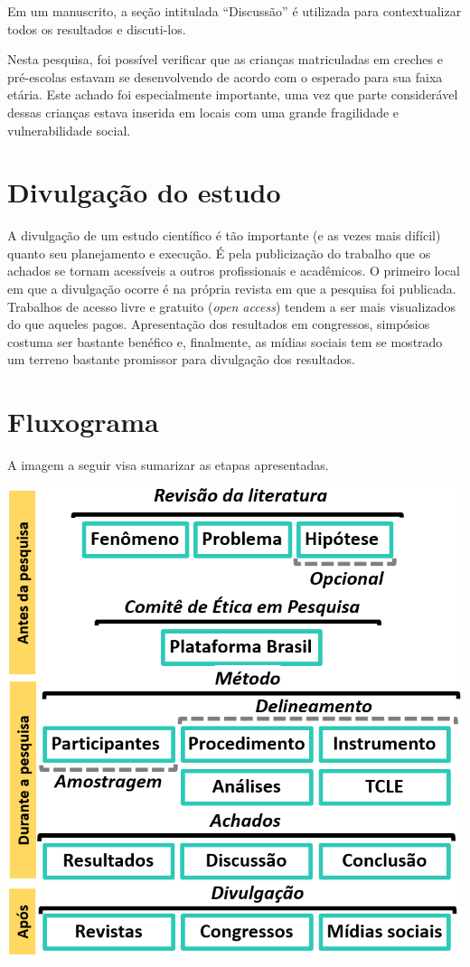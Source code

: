 \documentclass[
]{book}
\begin{document}
Em um manuscrito, a seção intitulada ``Discussão'' é utilizada para contextualizar todos os resultados e discuti-los.

Nesta pesquisa, foi possível verificar que as crianças matriculadas em creches e pré-escolas estavam se desenvolvendo de acordo com o esperado para sua faixa etária. Este achado foi especialmente importante, uma vez que parte considerável dessas crianças estava inserida em locais com uma grande fragilidade e vulnerabilidade social.

\hypertarget{divulgauxe7uxe3o-do-estudo}{%
\section{Divulgação do estudo}\label{divulgauxe7uxe3o-do-estudo}}

A divulgação de um estudo científico é tão importante (e as vezes mais difícil) quanto seu planejamento e execução. É pela publicização do trabalho que os achados se tornam acessíveis a outros profissionais e acadêmicos. O primeiro local em que a divulgação ocorre é na própria revista em que a pesquisa foi publicada. Trabalhos de acesso livre e gratuito (\emph{open access}) tendem a ser mais visualizados do que aqueles pagos. Apresentação dos resultados em congressos, simpósios costuma ser bastante benéfico e, finalmente, as mídias sociais tem se mostrado um terreno bastante promissor para divulgação dos resultados.

\hypertarget{fluxograma}{%
\section{Fluxograma}\label{fluxograma}}

A imagem a seguir visa sumarizar as etapas apresentadas.

\includegraphics{./img/cap_pesquisa_aplicada_fluxograma.png}
\end{document}
